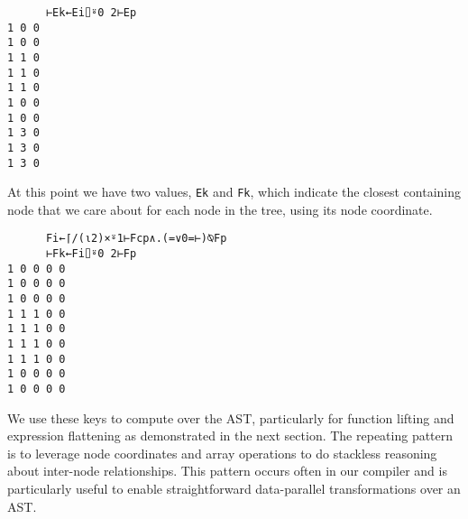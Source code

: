 \documentclass[numbers,9pt]{sigplanconf}
\begin{document}
\begin{verbatim}
      ⊢Ek←Ei⌷⍤0 2⊢Ep 
1 0 0
1 0 0
1 1 0
1 1 0
1 1 0
1 0 0
1 0 0
1 3 0
1 3 0
1 3 0
\end{verbatim}

\noindent
At this point we have two values, \verb;Ek; and \verb;Fk;, which indicate the
closest containing node that we care about for each node in the tree,
using its node coordinate.

\begin{verbatim}
      Fi←⌈/(⍳2)×⍤1⊢Fcp∧.(=∨0=⊢)⍉Fp
      ⊢Fk←Fi⌷⍤0 2⊢Fp
1 0 0 0 0
1 0 0 0 0
1 0 0 0 0
1 1 1 0 0
1 1 1 0 0
1 1 1 0 0
1 1 1 0 0
1 0 0 0 0
1 0 0 0 0
\end{verbatim}

\noindent
We use these keys to compute over the AST, particularly for function lifting 
and expression flattening as demonstrated in the next section. The repeating 
pattern is to leverage node coordinates and array operations to do stackless 
reasoning about inter-node relationships. This pattern occurs often in our 
compiler and is particularly useful to enable straightforward data-parallel 
transformations over an AST.
\end{document}
